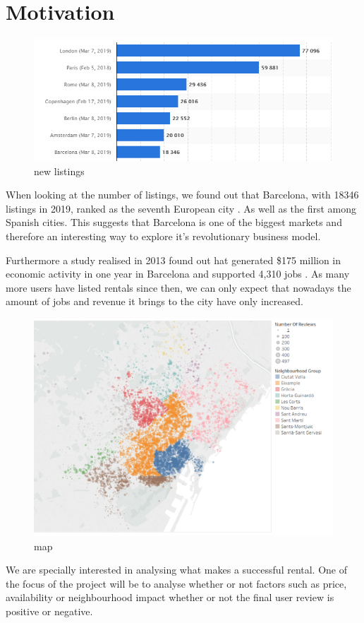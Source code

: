 

\section{Motivation}%
\label{sec:motivation}

\begin{figure}[H]
    \centering
    \includegraphics[width=0.8\linewidth]{images/listingplot}
    \caption{ new listings}%
    \label{fig:airbnblistingsPlot.PNG}
\end{figure}

When looking at the number of \airbnb listings, we found out that Barcelona, with 18346 listings in 2019, ranked as the seventh European city \cite{europe2019}. As well as the first among Spanish cities. This suggests that Barcelona is one of the biggest \airbnb markets and therefore an interesting way to explore it's revolutionary business model.

Furthermore a study realised in 2013 found out hat \airbnb generated \$175 million in economic activity in one year in Barcelona and supported 4,310 jobs \cite{economy}. As many more users have listed rentals since then, we can only expect that nowadays the amount of jobs and revenue it brings to the city have only increased.

\begin{figure}[H]
    \centering
    \includegraphics[width=0.8\linewidth]{images/airbnbMap}
    \caption{\airbnb map}%
    \label{fig:airbnbMap.PNG}
\end{figure}

We are specially interested in analysing what makes a successful \airbnb rental. One of the focus of the project will be to analyse whether or not factors such as price, availability or neighbourhood impact whether or not the final user review is positive or negative. 


